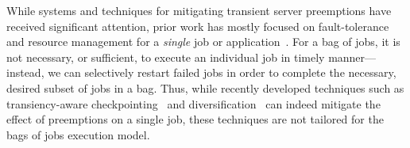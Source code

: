 While systems and techniques for mitigating transient server preemptions have received significant attention, prior work has mostly focused on fault-tolerance and resource management for a \emph{single} job or application~\cite{spoton, exosphere, flint, marathe2014exploiting}. 
For a bag of jobs, it is not necessary, or sufficient, to execute an individual job in timely manner---instead, we can selectively restart failed jobs in order to complete the necessary, desired subset of jobs in a bag.
Thus, while recently developed techniques such as transiency-aware checkpointing~\cite{marathe2014exploiting, flint}
and diversification~\cite{exosphere, spotweb} can indeed mitigate the effect of preemptions on a single job, these techniques are not tailored for the bags of jobs execution model. 



